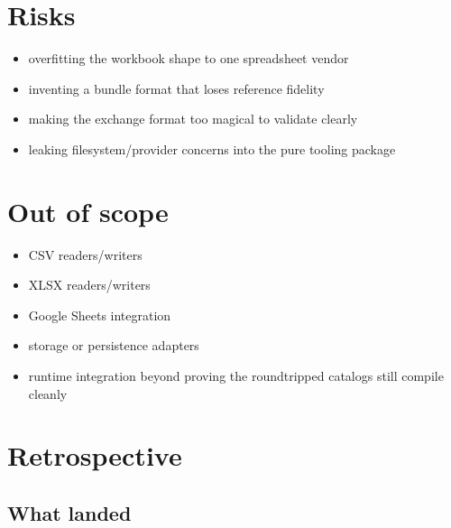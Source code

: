 \section{Risks}\label{record-190-risks}

\begin{itemize}
\tightlist
\item
  overfitting the workbook shape to one spreadsheet vendor
\item
  inventing a bundle format that loses reference fidelity
\item
  making the exchange format too magical to validate clearly
\item
  leaking filesystem/provider concerns into the pure tooling package
\end{itemize}

\section{Out of scope}\label{record-190-out-of-scope}

\begin{itemize}
\tightlist
\item
  CSV readers/writers
\item
  XLSX readers/writers
\item
  Google Sheets integration
\item
  storage or persistence adapters
\item
  runtime integration beyond proving the roundtripped catalogs still compile cleanly
\end{itemize}

\section{Retrospective}\label{record-190-retrospective}

\subsection{What landed}\label{record-190-what-landed}

